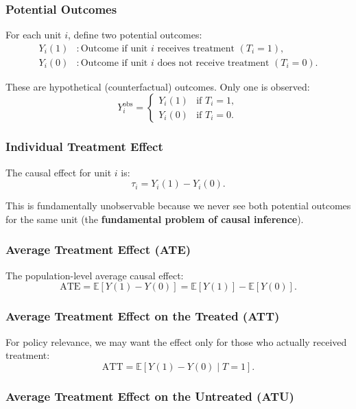 \documentclass[12pt]{article}
\numberwithin{equation}{section}
\begin{document}
	\subsubsection{Potential Outcomes}
	
	For each unit $i$, define two potential outcomes:
	\begin{align}
		Y_i(1) &: \text{Outcome if unit $i$ receives treatment } (T_i = 1), \\
		Y_i(0) &: \text{Outcome if unit $i$ does not receive treatment } (T_i = 0).
	\end{align}
	
	These are hypothetical (counterfactual) outcomes. Only one is observed:
	\[
	Y_i^{\text{obs}} = \begin{cases} 
		Y_i(1) & \text{if } T_i = 1, \\
		Y_i(0) & \text{if } T_i = 0.
	\end{cases}
	\]
	
	\subsubsection{Individual Treatment Effect}
	
	The causal effect for unit $i$ is:
	\[
	\tau_i = Y_i(1) - Y_i(0).
	\]
	
	This is fundamentally unobservable because we never see both potential outcomes for the same unit (the \textbf{fundamental problem of causal inference}).
	
	\subsubsection{Average Treatment Effect (ATE)}
	
	The population-level average causal effect:
	\[
	\text{ATE} = \mathbb{E}[Y(1) - Y(0)] = \mathbb{E}[Y(1)] - \mathbb{E}[Y(0)].
	\]
	
	\subsubsection{Average Treatment Effect on the Treated (ATT)}
	
	For policy relevance, we may want the effect only for those who actually received treatment:
	\[
	\text{ATT} = \mathbb{E}[Y(1) - Y(0) \mid T = 1].
	\]
	
	\subsubsection{Average Treatment Effect on the Untreated (ATU)}
	
\end{document}
